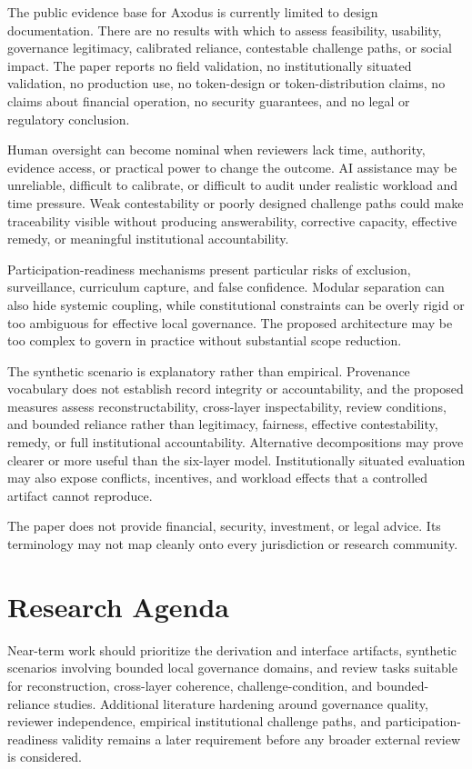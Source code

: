 \documentclass[11pt]{article}
\begin{document}
The public evidence base for Axodus is currently limited to design
documentation. There are no results with which to assess feasibility,
usability, governance legitimacy, calibrated reliance, contestable challenge
paths, or social impact. The paper reports no field validation, no
institutionally situated validation, no production use, no token-design or
token-distribution claims, no claims about financial operation, no security
guarantees, and no legal or regulatory conclusion.

Human oversight can become nominal when reviewers lack time, authority,
evidence access, or practical power to change the outcome. AI assistance may
be unreliable, difficult to calibrate, or difficult to audit under realistic
workload and time pressure. Weak contestability or poorly designed challenge
paths could make traceability visible without producing answerability,
corrective capacity, effective remedy, or meaningful institutional
accountability.

Participation-readiness mechanisms present particular risks of exclusion,
surveillance, curriculum capture, and false confidence. Modular separation
can also hide systemic coupling, while constitutional constraints can be
overly rigid or too ambiguous for effective local governance. The proposed
architecture may be too complex to govern in practice without substantial
scope reduction.

The synthetic scenario is explanatory rather than empirical. Provenance
vocabulary does not establish record integrity or accountability, and the
proposed measures assess reconstructability, cross-layer inspectability,
review conditions, and bounded reliance rather than legitimacy, fairness,
effective contestability, remedy, or full institutional accountability.
Alternative decompositions may prove clearer or more useful than the six-layer
model. Institutionally situated evaluation may also expose conflicts,
incentives, and workload effects that a controlled artifact cannot reproduce.

The paper does not provide financial, security, investment, or legal advice.
Its terminology may not map cleanly onto every jurisdiction or research
community.

\section{Research Agenda}

Near-term work should prioritize the derivation and interface artifacts,
synthetic scenarios involving bounded local governance domains, and review
tasks suitable for reconstruction, cross-layer coherence, challenge-condition,
and bounded-reliance studies.
Additional literature hardening around governance quality, reviewer
independence, empirical institutional challenge paths, and participation-
readiness validity remains a later requirement before any broader external
review is considered.
\end{document}
